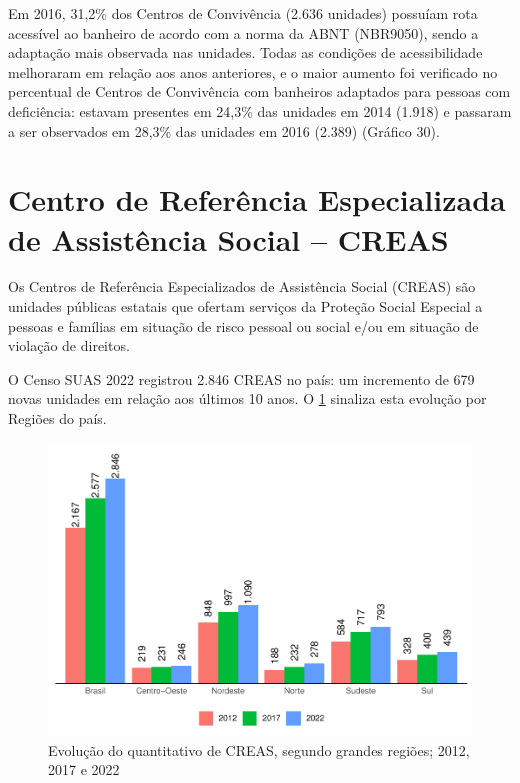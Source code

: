 \documentclass[
  brazilian]{report}
\begin{document}
Em 2016, 31,2\% dos Centros de Convivência (2.636 unidades) possuíam
rota acessível ao banheiro de acordo com a norma da ABNT (NBR9050),
sendo a adaptação mais observada nas unidades. Todas as condições de
acessibilidade melhoraram em relação aos anos anteriores, e o maior
aumento foi verificado no percentual de Centros de Convivência com
banheiros adaptados para pessoas com deficiência: estavam presentes em
24,3\% das unidades em 2014 (1.918) e passaram a ser observados em
28,3\% das unidades em 2016 (2.389) (Gráfico 30).

\hypertarget{centro-de-referuxeancia-especializada-de-assistuxeancia-social-creas}{%
\section{Centro de Referência Especializada de Assistência Social --
CREAS}\label{centro-de-referuxeancia-especializada-de-assistuxeancia-social-creas}}

Os Centros de Referência Especializados de Assistência Social (CREAS)
são unidades públicas estatais que ofertam serviços da Proteção Social
Especial a pessoas e famílias em situação de risco pessoal ou social
e/ou em situação de violação de direitos.

O Censo SUAS 2022 registrou 2.846 CREAS no país: um incremento de 679
novas unidades em relação aos últimos 10 anos. O
\cref{fig:creas-quantitativo} sinaliza esta evolução por Regiões do
país.

\begin{figure}
\includegraphics{Censo-SUAS-2022_files/figure-latex/creas-quantitativo-1} \caption[Evolução do quantitativo de CREAS, segundo grandes regiões]{Evolução do quantitativo de CREAS, segundo grandes regiões; 2012, 2017 e 2022}\label{fig:creas-quantitativo}
\end{figure}
\end{document}
